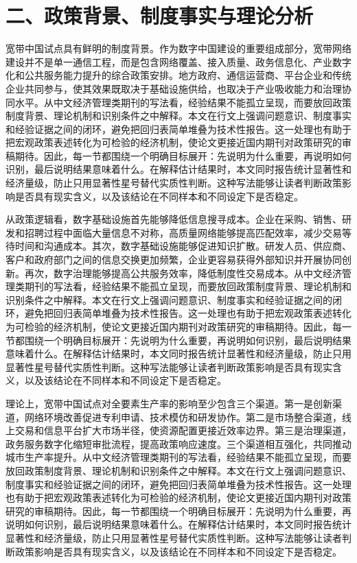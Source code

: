 \documentclass[12pt,a4paper]{article}
\begin{document}
\section*{二、政策背景、制度事实与理论分析}
宽带中国试点具有鲜明的制度背景。作为数字中国建设的重要组成部分，宽带网络建设并不是单一通信工程，而是包含网络覆盖、接入质量、政务信息化、产业数字化和公共服务能力提升的综合政策安排。地方政府、通信运营商、平台企业和传统企业共同参与，使其效果既取决于基础设施供给，也取决于产业吸收能力和治理协同水平。从中文经济管理类期刊的写法看，经验结果不能孤立呈现，而要放回政策制度背景、理论机制和识别条件之中解释。本文在行文上强调问题意识、制度事实和经验证据之间的闭环，避免把回归表简单堆叠为技术性报告。这一处理也有助于把宏观政策表述转化为可检验的经济机制，使论文更接近国内期刊对政策研究的审稿期待。因此，每一节都围绕一个明确目标展开：先说明为什么重要，再说明如何识别，最后说明结果意味着什么。在解释估计结果时，本文同时报告统计显著性和经济量级，防止只用显著性星号替代实质性判断。这种写法能够让读者判断政策影响是否具有现实含义，以及该结论在不同样本和不同设定下是否稳定。

从政策逻辑看，数字基础设施首先能够降低信息搜寻成本。企业在采购、销售、研发和招聘过程中面临大量信息不对称，高质量网络能够提高匹配效率，减少交易等待时间和沟通成本。其次，数字基础设施能够促进知识扩散。研发人员、供应商、客户和政府部门之间的信息交换更加频繁，企业更容易获得外部知识并开展协同创新。再次，数字治理能够提高公共服务效率，降低制度性交易成本。从中文经济管理类期刊的写法看，经验结果不能孤立呈现，而要放回政策制度背景、理论机制和识别条件之中解释。本文在行文上强调问题意识、制度事实和经验证据之间的闭环，避免把回归表简单堆叠为技术性报告。这一处理也有助于把宏观政策表述转化为可检验的经济机制，使论文更接近国内期刊对政策研究的审稿期待。因此，每一节都围绕一个明确目标展开：先说明为什么重要，再说明如何识别，最后说明结果意味着什么。在解释估计结果时，本文同时报告统计显著性和经济量级，防止只用显著性星号替代实质性判断。这种写法能够让读者判断政策影响是否具有现实含义，以及该结论在不同样本和不同设定下是否稳定。

理论上，宽带中国试点对全要素生产率的影响至少包含三个渠道。第一是创新渠道，网络环境改善促进专利申请、技术模仿和研发协作。第二是市场整合渠道，线上交易和信息平台扩大市场半径，使资源配置更接近效率边界。第三是治理渠道，政务服务数字化缩短审批流程，提高政策响应速度。三个渠道相互强化，共同推动城市生产率提升。从中文经济管理类期刊的写法看，经验结果不能孤立呈现，而要放回政策制度背景、理论机制和识别条件之中解释。本文在行文上强调问题意识、制度事实和经验证据之间的闭环，避免把回归表简单堆叠为技术性报告。这一处理也有助于把宏观政策表述转化为可检验的经济机制，使论文更接近国内期刊对政策研究的审稿期待。因此，每一节都围绕一个明确目标展开：先说明为什么重要，再说明如何识别，最后说明结果意味着什么。在解释估计结果时，本文同时报告统计显著性和经济量级，防止只用显著性星号替代实质性判断。这种写法能够让读者判断政策影响是否具有现实含义，以及该结论在不同样本和不同设定下是否稳定。
\end{document}
